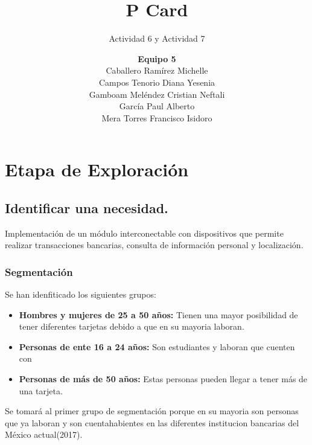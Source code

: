 \documentclass[11pt]{book}
\title{P Card}
\author{\textbf{Equipo 5}\\Caballero Ramírez Michelle\\Campos Tenorio Diana Yesenia\\Gamboam Meléndez Cristian Neftali\\García Paul Alberto\\Mera Torres Francisco Isidoro}
\subtitle{Actividad 6 y Actividad 7}
\date{}
\begin{document}
	\maketitle
	\makeProjectCharter
	\makeFirmas
	\tableofcontents
\chapter{Etapa de Exploración}
	
	\section{Identificar una necesidad.}

	Implementación de un módulo interconectable con dispositivos que permite realizar transacciones bancarias, consulta de información personal y localización.
	
	\subsection{Segmentación}

	Se han idenfiticado los siguientes grupos:
	\begin{itemize}
		\item \textbf{Hombres y mujeres de 25 a 50 años:} Tienen una mayor posibilidad de tener diferentes tarjetas debido a que en su mayoria laboran.
		\item \textbf{Personas de ente 16 a 24 años:} Son estudiantes y laboran que cuenten con 
		\item \textbf{Personas de más de 50 años:} Estas personas pueden llegar a tener más de una tarjeta.
	\end{itemize}
	
	Se tomará al primer grupo de segmentación porque en su mayoria son personas que ya laboran y son cuentahabientes en las diferentes institucion bancarias del México actual(2017).
		
	
\end{document}
